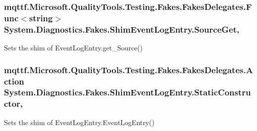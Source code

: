\hypertarget{class_system_1_1_diagnostics_1_1_fakes_1_1_shim_event_log_entry_ad4ab318b6c63e4abfd7596a28b6cbb75}{
\subsubsection[{Source\-Get}]{\setlength{\rightskip}{0pt plus 5cm}mqttf.\-Microsoft.\-Quality\-Tools.\-Testing.\-Fakes.\-Fakes\-Delegates.\-Func$<$string$>$ System.\-Diagnostics.\-Fakes.\-Shim\-Event\-Log\-Entry.\-Source\-Get\hspace{0.3cm}{\ttfamily [get]}, {\ttfamily [set]}}}\label{class_system_1_1_diagnostics_1_1_fakes_1_1_shim_event_log_entry_ad4ab318b6c63e4abfd7596a28b6cbb75}


Sets the shim of Event\-Log\-Entry.\-get\-\_\-\-Source()

\hypertarget{class_system_1_1_diagnostics_1_1_fakes_1_1_shim_event_log_entry_a3b369359db591c536798b59ef7068820}{
\subsubsection[{Static\-Constructor}]{\setlength{\rightskip}{0pt plus 5cm}mqttf.\-Microsoft.\-Quality\-Tools.\-Testing.\-Fakes.\-Fakes\-Delegates.\-Action System.\-Diagnostics.\-Fakes.\-Shim\-Event\-Log\-Entry.\-Static\-Constructor\hspace{0.3cm}{\ttfamily [static]}, {\ttfamily [set]}}}\label{class_system_1_1_diagnostics_1_1_fakes_1_1_shim_event_log_entry_a3b369359db591c536798b59ef7068820}


Sets the shim of Event\-Log\-Entry.\-Event\-Log\-Entry()

